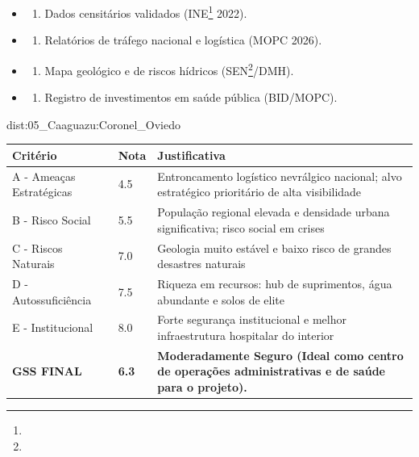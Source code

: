 {\begin{itemize}
\tightlist
\item
  \begin{enumerate}
  \def\labelenumi{\arabic{enumi})}
  \tightlist
  \item
    Dados censitários validados (INE\footnote{\fineINE} 2022).
  \end{enumerate}
\item
  \begin{enumerate}
  \def\labelenumi{\arabic{enumi})}
  \setcounter{enumi}{1}
  \tightlist
  \item
    Relatórios de tráfego nacional e logística (MOPC 2026).
  \end{enumerate}
\item
  \begin{enumerate}
  \def\labelenumi{\arabic{enumi})}
  \setcounter{enumi}{2}
  \tightlist
  \item
    Mapa geológico e de riscos hídricos (SEN\footnote{\fineSEN}/\allowbreak DMH).
  \end{enumerate}
\item
  \begin{enumerate}
  \def\labelenumi{\arabic{enumi})}
  \setcounter{enumi}{3}
  \tightlist
  \item
    Registro de investimentos em saúde pública (BID/\allowbreak MOPC).
  \end{enumerate}
\end{itemize}}{dist:05_Caaguazu:Coronel_Oviedo}
\begin{table}[ht!]
\small \begin{tabular}{p{3.0cm}p{0.8cm}p{6.0cm}} \toprule
\textbf{Critério} & \textbf{Nota} & \textbf{Justificativa} \\ \midrule
A - Ameaças Estratégicas & 4.5 & Entroncamento logístico nevrálgico nacional; alvo estratégico prioritário de alta visibilidade \\
B - Risco Social & 5.5 & População regional elevada e densidade urbana significativa; risco social em crises \\
C - Riscos Naturais & 7.0 & Geologia muito estável e baixo risco de grandes desastres naturais \\
D - Autossuficiência & 7.5 & Riqueza em recursos: hub de suprimentos, água abundante e solos de elite \\
E - Institucional & 8.0 & Forte segurança institucional e melhor infraestrutura hospitalar do interior \\
\midrule \textbf{GSS FINAL} & \textbf{6.3} & \textbf{Moderadamente Seguro (Ideal como centro de operações administrativas e de saúde para o projeto).} \\ \bottomrule \end{tabular}
\end{table}
